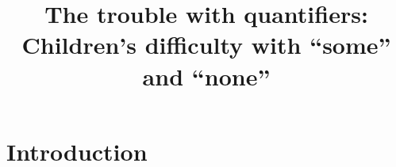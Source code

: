 \documentclass[man]{apa2}
\title{The trouble with quantifiers: Children's difficulty with ``some'' and ``none''}
\begin{document}
\maketitle               

\section{Introduction}
\end{document}
